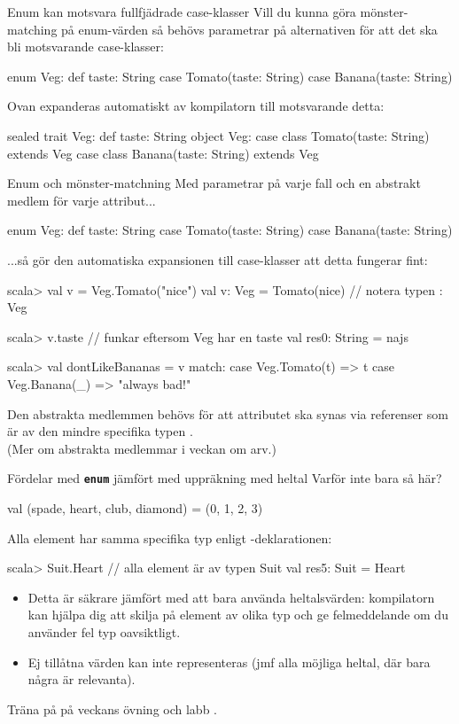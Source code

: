 \begin{Slide}{Enum kan motsvara fullfjädrade case-klasser}
Vill du kunna göra mönster-matching på enum-värden så behövs parametrar på alternativen för att det ska bli motsvarande case-klasser: 
\begin{Code}
enum Veg:
  def taste: String
  case Tomato(taste: String)
  case Banana(taste: String)
\end{Code}
Ovan expanderas automatiskt av kompilatorn till motsvarande detta:
\begin{Code}
sealed trait Veg:
  def taste: String
object Veg:
  case class Tomato(taste: String) extends Veg
  case class Banana(taste: String) extends Veg
\end{Code}
\end{Slide}

\begin{Slide}{Enum och mönster-matchning}
\SlideFontSmall
Med parametrar på varje fall och en abstrakt medlem för varje attribut... 
\begin{Code}
enum Veg:
  def taste: String
  case Tomato(taste: String)
  case Banana(taste: String)
\end{Code}
...så gör den automatiska expansionen till case-klasser att detta fungerar fint: 
\begin{REPLsmall}
scala> val v = Veg.Tomato("nice") 
val v: Veg = Tomato(nice)             // notera typen : Veg

scala> v.taste  // funkar eftersom Veg har en taste
val res0: String = najs

scala> val dontLikeBananas = v match:
           case Veg.Tomato(t) => t 
           case Veg.Banana(_) => "always bad!" 
\end{REPLsmall}
Den abstrakta medlemmen  behövs för att attributet ska synas via referenser som är av den mindre specifika typen .\\(Mer om abstrakta medlemmar i veckan om arv.)

\end{Slide}


\begin{Slide}{Fördelar med \texttt{\textbf{enum}} jämfört med uppräkning med heltal}
Varför inte bara så här?
\begin{Code}
val (spade, heart, club, diamond) = (0, 1, 2, 3)  
\end{Code}  
Alla element har samma specifika typ enligt -deklarationen:  
\begin{REPL}
scala> Suit.Heart              // alla element är av typen Suit 
val res5: Suit = Heart
\end{REPL}

\begin{itemize}
\item Detta är säkrare jämfört med att bara använda heltalsvärden: kompilatorn kan hjälpa dig att skilja på element av olika typ och ge felmeddelande om du använder fel typ oavsiktligt. 
\item Ej tillåtna värden kan inte representeras (jmf alla möjliga heltal, där bara några är relevanta).
\end{itemize}  
Träna på  på veckans övning  och labb .
\end{Slide}
